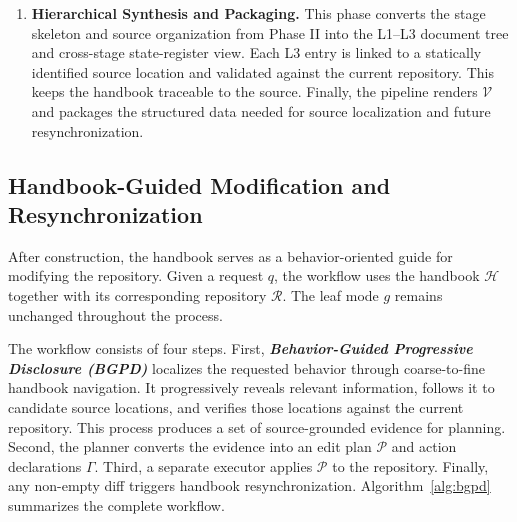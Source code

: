 \documentclass[]{ailab}
\begin{document}
\begin{enumerate}[wide=0pt,labelsep=0.5em,itemsep=4pt,topsep=3pt,label=\textbf{Phase \Roman*.}]
\item \textbf{Hierarchical Synthesis and Packaging.} This phase converts the
stage skeleton and source organization from Phase II into the L1--L3 document
tree and cross-stage state-register view. Each L3 entry is linked to a
statically identified source location and validated against the current
repository. This keeps the handbook traceable to the source. Finally, the
pipeline renders $\mathcal{V}$ and packages the structured data needed for
source localization and future resynchronization.

\end{enumerate}

\subsection{Handbook-Guided Modification and Resynchronization}
\label{sec:modification}

After construction, the handbook serves as a behavior-oriented guide for
modifying the repository. Given a request $q$, the workflow uses the handbook
$\mathcal{H}$ together with its corresponding repository $\mathcal{R}$. The leaf
mode $g$ remains unchanged throughout the process.

The workflow consists of four steps. First, \emph{\textbf{Behavior-Guided
Progressive Disclosure (BGPD)}} localizes the requested behavior through
coarse-to-fine handbook navigation. It progressively reveals relevant
information, follows it to candidate source locations, and verifies those
locations against the current repository. This process produces a set of
source-grounded evidence for planning. Second, the planner converts the evidence
into an edit plan $\mathcal{P}$ and action declarations $\Gamma$. Third, a
separate executor applies $\mathcal{P}$ to the repository. Finally, any
non-empty diff triggers handbook resynchronization.
Algorithm~\ref{alg:bgpd} summarizes the complete workflow.
\end{document}
